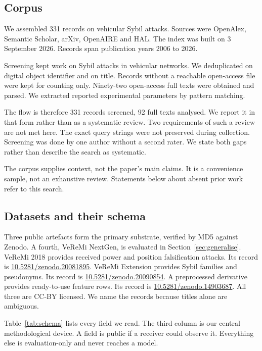 \documentclass[journal,twoside]{IEEEtran}
\begin{document}
\subsection{Corpus}

We assembled 331 records on vehicular Sybil attacks.
Sources were OpenAlex, Semantic Scholar, arXiv, OpenAIRE and HAL.
The index was built on 3 September 2026.
Records span publication years 2006 to 2026.

Screening kept work on Sybil attacks in vehicular networks.
We deduplicated on digital object identifier and on title.
Records without a reachable open-access file were kept for counting only.
Ninety-two open-access full texts were obtained and parsed.
We extracted reported experimental parameters by pattern matching.

The flow is therefore 331 records screened, 92 full texts analysed.
We report it in that form rather than as a systematic review.
Two requirements of such a review are not met here.
The exact query strings were not preserved during collection.
Screening was done by one author without a second rater.
We state both gaps rather than describe the search as systematic.

The corpus supplies context, not the paper's main claims.
It is a convenience sample, not an exhaustive review.
Statements below about absent prior work refer to this search.

\subsection{Datasets and their schema}

Three public artefacts form the primary substrate, verified by MD5 against Zenodo.
A fourth, VeReMi NextGen, is evaluated in Section~\ref{sec:generalise}.
VeReMi 2018 provides received power and position falsification attacks.
Its record is \url{10.5281/zenodo.20081895}.
VeReMi Extension provides Sybil families and pseudonyms.
Its record is \url{10.5281/zenodo.20090854}.
A preprocessed derivative provides ready-to-use feature rows.
Its record is \url{10.5281/zenodo.14903687}.
All three are CC-BY licensed.
We name the records because titles alone are ambiguous.

Table~\ref{tab:schema} lists every field we read.
The third column is our central methodological device.
A field is public if a receiver could observe it.
Everything else is evaluation-only and never reaches a model.
\end{document}
